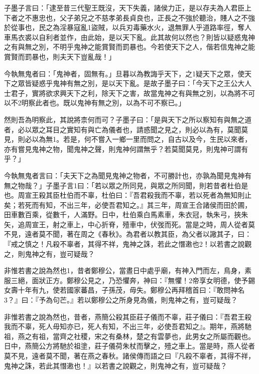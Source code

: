 
\begin{pinyinscope}
子墨子言曰：「逮至昔三代聖王既沒，天下失義，諸侯力正，是以存夫為人君臣上下者之不惠忠也，父子弟兄之不慈孝弟長貞良也，正長之不強於聽治，賤人之不強於從事也，民之為淫暴寇亂1盜賊，以兵刃毒藥水火，退無罪人乎道路率徑，奪人車馬衣裘以自利者並作，由此始，是以天下亂。此其故何以然也？則皆以疑惑鬼神之有與無之別，不明乎鬼神之能賞賢而罰暴也。今若使天下之人，偕若信鬼神之能賞賢而罰暴也，則夫天下豈亂哉！」

今執無鬼者曰：「鬼神者，固無有。」旦暮以為教誨乎天下，之1疑天下之眾，使天下之眾皆疑惑乎鬼神有無之別，是以天下亂。是故子墨子曰：「今天下之王公大人士君子，實將欲求興天下之利，除天下之害，故當鬼神之有與無之別，以為將不可以不2明察此者也。既以鬼神有無之別，以為不可不察已。」

然則吾為明察此，其說將柰何而可？子墨子曰：「是與天下之所以察知有與無之道者，必以眾之耳目之實知有與亡為儀者也，請惑聞之見之，則必以為有，莫聞莫見，則必以為無1。若是，何不嘗入一鄉一里而問之，自古以及今，生民以來者，亦有嘗見鬼神之物，聞鬼神之聲，則鬼神何謂無乎？若莫聞莫見，則鬼神可謂有乎？」

今執無鬼者言曰：「夫天下之為聞見鬼神之物者，不可勝計也，亦孰為聞見鬼神有無之物哉？」子墨子言1曰：「若以眾之所同見，與眾之所同聞，則若昔者杜伯是也。周宣王殺其臣杜伯而不辜，杜伯曰：『吾君殺我而不辜，若以死者為無知則止矣；若死而有知，不出三年，必使吾君知之。』其三年，周宣王合諸侯而田於圃，田車數百乘，從數千，人滿野。日中，杜伯乘白馬素車，朱衣冠，執朱弓，挾朱矢，追周宣王，射之車上，中心折脊，殪車中，伏弢而死。當是之時，周人從者莫不見，遠者莫不聞，著在周之《春秋》。為君者以教其臣，為父者以䜘其子，曰：『戒之慎之！凡殺不辜者，其得不祥，鬼神之誅，若此之憯遫也2！以若書之說觀之，則鬼神之有，豈可疑哉？

非惟若書之說為然也1，昔者鄭穆公，當晝日中處乎廟，有神入門而左，鳥身，素服三絕，面狀正方。鄭穆公見之，乃恐懼奔，神曰：『無懼！2帝享女明德，使予錫女壽十年有九，使若國家蕃昌，子孫茂，毋失。鄭穆公再拜稽首曰：『敢問神名3？』曰：『予為句芒。』若以鄭穆公之所身見為儀，則鬼神之有，豈可疑哉？

非惟若書之說為然也，昔者，燕簡公殺其臣莊子儀而不辜，莊子儀曰：『吾君王殺我而不辜，死人毋知亦已，死人有知，不出三年，必使吾君知之』。期年，燕將馳祖，燕之有祖，當齊之社稷，宋之有桑林，楚之有雲夢也，此男女之所屬而觀也。日中，燕簡公方將馳於祖塗，莊子儀荷朱杖而擊之，殪之車上。當是時，燕人從者莫不見，遠者莫不聞，著在燕之春秋。諸侯傳而語之曰『凡殺不辜者，其得不祥，鬼神之誅，若此其憯遫也！』以若書之說觀之，則鬼神之有，豈可疑哉？


\end{pinyinscope}
